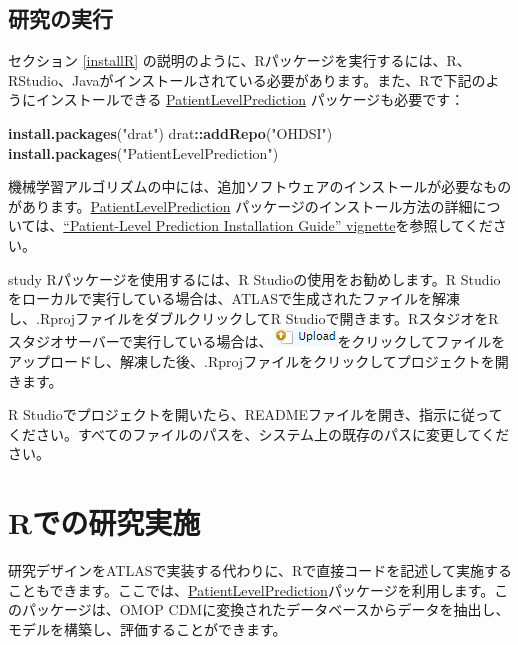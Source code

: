 \documentclass[
  11pt]{book}
\newenvironment{Shaded}{\begin{snugshade}}{\end{snugshade}}
\newcommand{\FunctionTok}[1]{\textcolor[rgb]{0.13,0.29,0.53}{\textbf{#1}}}
\newcommand{\NormalTok}[1]{#1}
\newcommand{\SpecialCharTok}[1]{\textcolor[rgb]{0.81,0.36,0.00}{\textbf{#1}}}
\newcommand{\StringTok}[1]{\textcolor[rgb]{0.31,0.60,0.02}{#1}}
\theoremstyle{definition}
\theoremstyle{definition}
\theoremstyle{definition}
\theoremstyle{definition}
\theoremstyle{remark}
\begin{document}
\subsection{研究の実行}\label{ux7814ux7a76ux306eux5b9fux884c}

セクション \ref{installR} の説明のように、Rパッケージを実行するには、R、RStudio、Javaがインストールされている必要があります。また、Rで下記のようにインストールできる \href{https://ohdsi.github.io/PatientLevelPrediction/}{PatientLevelPrediction} パッケージも必要です：

\begin{Shaded}
\begin{Highlighting}[]
\FunctionTok{install.packages}\NormalTok{(}\StringTok{"drat"}\NormalTok{)}
\NormalTok{drat}\SpecialCharTok{::}\FunctionTok{addRepo}\NormalTok{(}\StringTok{"OHDSI"}\NormalTok{)}
\FunctionTok{install.packages}\NormalTok{(}\StringTok{"PatientLevelPrediction"}\NormalTok{)}
\end{Highlighting}
\end{Shaded}

機械学習アルゴリズムの中には、追加ソフトウェアのインストールが必要なものがあります。\href{https://ohdsi.github.io/PatientLevelPrediction/}{PatientLevelPrediction} パッケージのインストール方法の詳細については、\href{https://ohdsi.github.io/PatientLevelPrediction/articles/InstallationGuide.html}{``Patient-Level Prediction Installation Guide'' vignette}を参照してください。

study Rパッケージを使用するには、R Studioの使用をお勧めします。R Studioをローカルで実行している場合は、ATLASで生成されたファイルを解凍し、.RprojファイルをダブルクリックしてR Studioで開きます。RスタジオをRスタジオサーバーで実行している場合は、\includegraphics{images/PopulationLevelEstimation/upload.png}をクリックしてファイルをアップロードし、解凍した後、.Rprojファイルをクリックしてプロジェクトを開きます。

R Studioでプロジェクトを開いたら、READMEファイルを開き、指示に従ってください。すべてのファイルのパスを、システム上の既存のパスに変更してください。

\section{Rでの研究実施}\label{rux3067ux306eux7814ux7a76ux5b9fux65bd}

研究デザインをATLASで実装する代わりに、Rで直接コードを記述して実施することもできます。ここでは、\href{https://ohdsi.github.io/PatientLevelPrediction/}{PatientLevelPrediction}パッケージを利用します。このパッケージは、OMOP CDMに変換されたデータベースからデータを抽出し、モデルを構築し、評価することができます。
\end{document}

